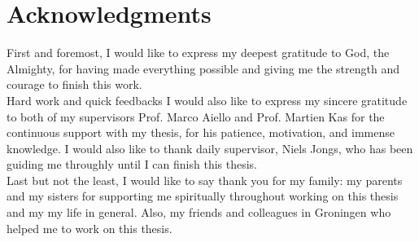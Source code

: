 
\begingroup
\let\clearpage\relax
\let\cleardoublepage\relax
\let\cleardoublepage\relax
\chapter*{Acknowledgments}
First and foremost, I would like to express my deepest gratitude to God, the Almighty, for having made everything possible and giving me the strength and courage to finish this work.\\

\noindent
Hard work and quick feedbacks
I would also like to express my sincere gratitude to both of my supervisors Prof. Marco Aiello and Prof. Martien Kas for the continuous support with my thesis, for his patience, motivation, and immense knowledge. I would also like to thank daily supervisor, Niels Jongs, who has been guiding me throughly until I can finish this thesis.\\

\noindent
Last but not the least, I would like to say thank you for my family: my parents and my sisters for supporting me spiritually throughout working on this thesis and my my life in general. Also, my friends and colleagues in Groningen who helped me to work on this thesis.
\endgroup



